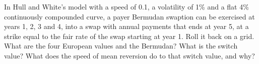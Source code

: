 \begin{question}\label{iq:iv2:rates-and-fx:50}
In Hull and White's model with a speed of 0.1, a volatility of 1\% and a flat 4\% continuously compounded curve, a payer Bermudan swaption can be exercised at years 1, 2, 3 and 4, into a swap with annual payments that ends at year 5, at a strike equal to the fair rate of the swap starting at year 1. Roll it back on a grid. What are the four European values and the Bermudan? What is the switch value? What does the speed of mean reversion do to that switch value, and why?
\end{question}
